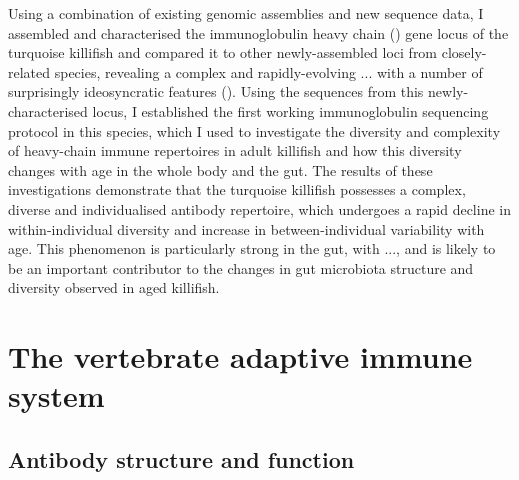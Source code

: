 Using a combination of existing genomic assemblies and new sequence data, I assembled and characterised the immunoglobulin heavy chain (\igh{}) gene locus of the turquoise killifish and compared it to other newly-assembled loci from closely-related species, revealing a complex and rapidly-evolving ... with a number of surprisingly ideosyncratic features (). Using the sequences from this newly-characterised locus, I established the first working immunoglobulin sequencing protocol in this species, which I used to investigate the diversity and complexity of heavy-chain immune repertoires in adult killifish and how this diversity changes with age in the whole body and the gut. The results of these investigations demonstrate that the turquoise killifish possesses a complex, diverse and individualised antibody repertoire, which undergoes a rapid decline in within-individual diversity and increase in between-individual variability with age. This phenomenon is particularly strong in the gut, with ..., and is likely to be an important contributor to the changes in gut microbiota structure and diversity observed in aged killifish. %



\section{The vertebrate adaptive immune system} %

\subsection{Antibody structure and function}
\label{sec:intro_antibody_structure}

